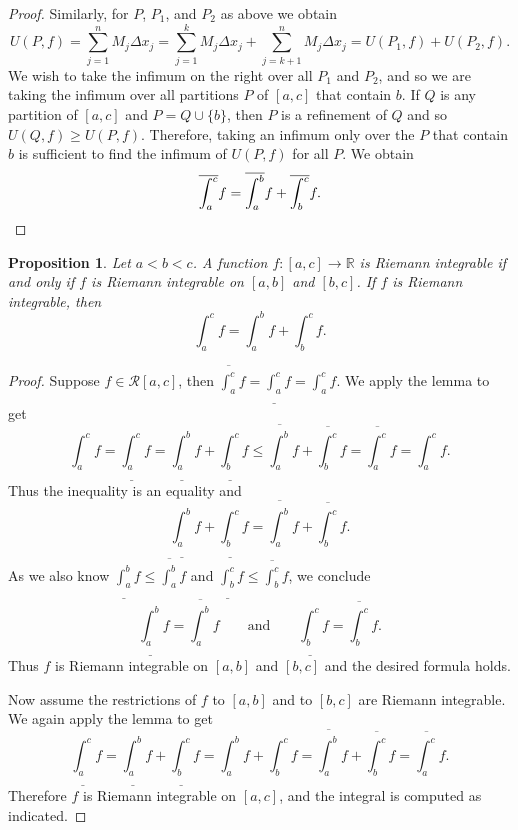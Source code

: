 \documentclass[12pt]{book}
\newcommand{\R}{{\mathbb{R}}}
\newcommand{\sR}{{\mathcal{R}}}
\theoremstyle{plain}
\newtheorem{prop}[thm]{Proposition}
\theoremstyle{remark}
\theoremstyle{definition}
\theoremstyle{exercise}
\theoremstyle{example}
\begin{document}
\begin{proof}
Similarly, for $P$, $P_1$, and $P_2$ as above we obtain
\begin{equation*}
U(P,f) =
\sum_{j=1}^n M_j \Delta x_j
=
\sum_{j=1}^k M_j \Delta x_j
+
\sum_{j=k+1}^n M_j \Delta x_j
=
U(P_1,f) + U(P_2,f) .
\end{equation*}
We wish to take the infimum on the right
over all $P_1$ and $P_2$, and so we are taking the infimum
over all partitions $P$ of $[a,c]$ that contain $b$.  If $Q$ is any partition
of $[a,c]$ and $P = Q \cup \{ b \}$, then $P$ is a refinement of $Q$
and so $U(Q,f) \geq U(P,f)$.  Therefore, taking an infimum only over the $P$
that contain $b$ is sufficient to find the infimum of $U(P,f)$ for
all $P$.
We obtain
\begin{equation*}
\overline{\int_a^c} f
=
\overline{\int_a^b} f + \overline{\int_b^c} f .  \qedhere
\end{equation*}
\end{proof}

\begin{prop}
Let $a < b < c$.  A function $f \colon [a,c] \to \R$ is Riemann integrable
if and only if $f$ is Riemann integrable on $[a,b]$ and $[b,c]$.  If
$f$ is Riemann integrable, then
\begin{equation*}
\int_a^c f
=
\int_a^b f
+
\int_b^c f .
\end{equation*}
\end{prop}

\begin{proof}
Suppose $f \in \sR[a,c]$, then 
$\overline{\int_a^c} f = 
\underline{\int_a^c} f = 
\int_a^c f$.  We apply the lemma to get
\begin{equation*}
\int_a^c f
=
\underline{\int_a^c} f
 =
\underline{\int_a^b} f + \underline{\int_b^c} f
 \leq
\overline{\int_a^b} f + \overline{\int_b^c} f
 =
\overline{\int_a^c} f
 =
\int_a^c f .
\end{equation*}
Thus the inequality is an equality and
\begin{equation*}
\underline{\int_a^b} f + \underline{\int_b^c} f
=
\overline{\int_a^b} f + \overline{\int_b^c} f .
\end{equation*}
As we also know 
$\underline{\int_a^b} f \leq \overline{\int_a^b} f$
and
$\underline{\int_b^c} f \leq \overline{\int_b^c} f$, we 
conclude 
\begin{equation*}
\underline{\int_a^b} f
=
\overline{\int_a^b} f
\qquad \text{and} \qquad
\underline{\int_b^c} f
=
\overline{\int_b^c} f .
\end{equation*}
Thus $f$ is Riemann integrable on $[a,b]$ and $[b,c]$ and the desired formula
holds.

Now assume the restrictions of $f$ to $[a,b]$ and to $[b,c]$
are Riemann integrable.  We again apply the lemma to get
\begin{equation*}
\underline{\int_a^c} f
=
\underline{\int_a^b} f + \underline{\int_b^c} f
=
\int_a^b f + \int_b^c f
=
\overline{\int_a^b} f + \overline{\int_b^c} f
=
\overline{\int_a^c} f .
\end{equation*}
Therefore $f$ is Riemann integrable on $[a,c]$, and the integral is computed
as indicated.
\end{proof}
\end{document}
